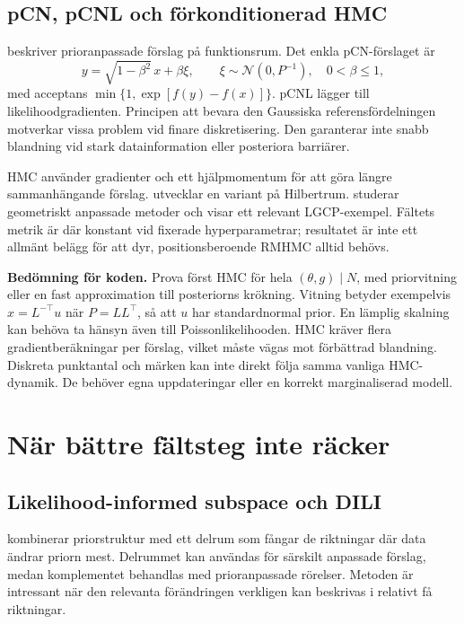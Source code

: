 \documentclass[11pt,a4paper]{article}
\newcommand{\N}{\mathcal N}
\begin{document}
\subsection{pCN, pCNL och förkonditionerad HMC}

\citet{cotter2013functions} beskriver prioranpassade förslag på funktionsrum. Det enkla pCN-förslaget är
\[
 y=\sqrt{1-\beta^2}\,x+\beta\xi,\qquad
 \xi\sim\N(0,P^{-1}),\quad 0<\beta\leq1,
\]
med acceptans $\min\{1,\exp[f(y)-f(x)]\}$. pCNL lägger till likelihoodgradienten. Principen att bevara den Gaussiska referensfördelningen motverkar vissa problem vid finare diskretisering. Den garanterar inte snabb blandning vid stark datainformation eller posteriora barriärer.

HMC använder gradienter och ett hjälpmomentum för att göra längre sammanhängande förslag. \citet{beskos2011hilbert} utvecklar en variant på Hilbertrum. \citet{girolami2011riemann} studerar geometriskt anpassade metoder och visar ett relevant LGCP-exempel. Fältets metrik är där konstant vid fixerade hyperparametrar; resultatet är inte ett allmänt belägg för att dyr, positionsberoende RMHMC alltid behövs.

\textbf{Bedömning för koden.} Prova först HMC för hela $(\theta,g)\mid N$, med priorvitning eller en fast approximation till posteriorns krökning. Vitning betyder exempelvis $x=L^{-\top}u$ när $P=LL^\top$, så att $u$ har standardnormal prior. En lämplig skalning kan behöva ta hänsyn även till Poissonlikelihooden. HMC kräver flera gradientberäkningar per förslag, vilket måste vägas mot förbättrad blandning. Diskreta punktantal och märken kan inte direkt följa samma vanliga HMC-dynamik. De behöver egna uppdateringar eller en korrekt marginaliserad modell.

\section{När bättre fältsteg inte räcker}

\subsection{Likelihood-informed subspace och DILI}

\citet{cui2016dili} kombinerar priorstruktur med ett delrum som fångar de riktningar där data ändrar priorn mest. Delrummet kan användas för särskilt anpassade förslag, medan komplementet behandlas med prioranpassade rörelser. Metoden är intressant när den relevanta förändringen verkligen kan beskrivas i relativt få riktningar.
\end{document}
